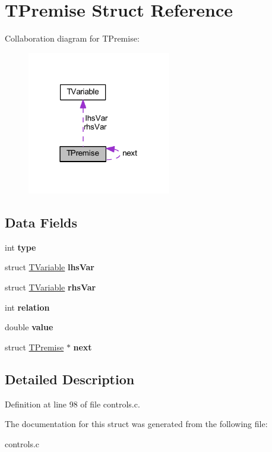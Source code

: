 \hypertarget{struct_t_premise}{}\section{T\+Premise Struct Reference}
\label{struct_t_premise}


Collaboration diagram for T\+Premise\+:
\nopagebreak
\begin{figure}[H]
\begin{center}
\leavevmode
\includegraphics[width=178pt]{d2/d6d/struct_t_premise__coll__graph}
\end{center}
\end{figure}
\subsection*{Data Fields}
\begin{DoxyCompactItemize}
\item 
\mbox{\label{struct_t_premise_ac765329451135abec74c45e1897abf26}} 
int {\bfseries type}
\item 
\mbox{\label{struct_t_premise_a66da50311571e9bd4dce5bc552ae70ee}} 
struct \hyperlink{struct_t_variable}{T\+Variable} {\bfseries lhs\+Var}
\item 
\mbox{\label{struct_t_premise_accdaaa49e39463596e8f1a9fa1dd9270}} 
struct \hyperlink{struct_t_variable}{T\+Variable} {\bfseries rhs\+Var}
\item 
\mbox{\label{struct_t_premise_a750ef3953d0a22d32daea401902988cc}} 
int {\bfseries relation}
\item 
\mbox{\label{struct_t_premise_aee90379adb0307effb138f4871edbc5c}} 
double {\bfseries value}
\item 
\mbox{\label{struct_t_premise_a6f99b3e46e668ccd4f277d499e9b3fbd}} 
struct \hyperlink{struct_t_premise}{T\+Premise} $\ast$ {\bfseries next}
\end{DoxyCompactItemize}


\subsection{Detailed Description}


Definition at line 98 of file controls.\+c.



The documentation for this struct was generated from the following file\+:\begin{DoxyCompactItemize}
\item 
controls.\+c\end{DoxyCompactItemize}

